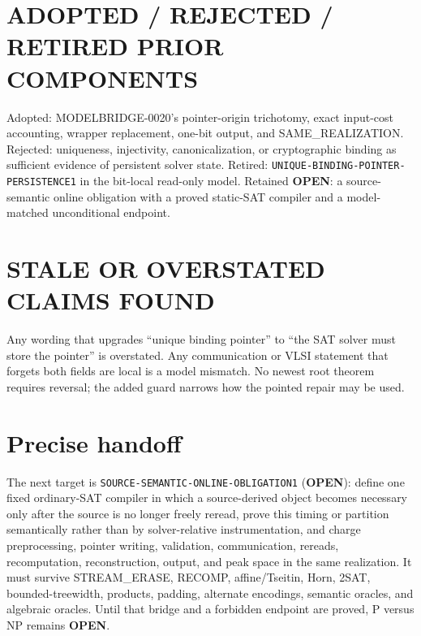 \documentclass[11pt]{article}
\newcommand{\OPEN}{\textbf{OPEN}}
\begin{document}
\section{ADOPTED / REJECTED / RETIRED PRIOR COMPONENTS}

Adopted: MODELBRIDGE-0020's pointer-origin trichotomy, exact input-cost
accounting, wrapper replacement, one-bit output, and SAME\_REALIZATION.
Rejected: uniqueness, injectivity, canonicalization, or cryptographic binding
as sufficient evidence of persistent solver state.  Retired:
\texttt{UNIQUE-BINDING-POINTER-PERSISTENCE1} in the bit-local read-only model.
Retained \OPEN: a source-semantic online obligation with a proved static-SAT
compiler and a model-matched unconditional endpoint.

\section{STALE OR OVERSTATED CLAIMS FOUND}

Any wording that upgrades ``unique binding pointer'' to ``the SAT solver must
store the pointer'' is overstated.  Any communication or VLSI statement that
forgets both fields are local is a model mismatch.  No newest root theorem
requires reversal; the added guard narrows how the pointed repair may be used.

\section{Precise handoff}

The next target is \texttt{SOURCE-SEMANTIC-ONLINE-OBLIGATION1} (\OPEN): define
one fixed ordinary-SAT compiler in which a source-derived object becomes
necessary only after the source is no longer freely reread, prove this timing
or partition semantically rather than by solver-relative instrumentation, and
charge preprocessing, pointer writing, validation, communication, rereads,
recomputation, reconstruction, output, and peak space in the same realization.
It must survive STREAM\_ERASE, RECOMP, affine/Tseitin, Horn, 2SAT,
bounded-treewidth, products, padding, alternate encodings, semantic oracles,
and algebraic oracles.  Until that bridge and a forbidden endpoint are proved,
P versus NP remains \OPEN.
\end{document}
